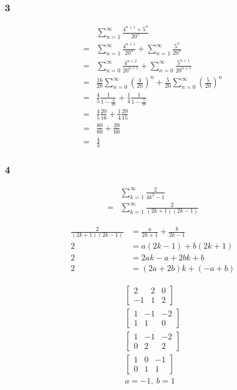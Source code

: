 \documentclass[12pt]{article}
\newcommand{\round}[1]{\left(       #1 \right)      }
\begin{document}
\subsubsection*{3}
\begin{align*}
     & \sum_{n=1}^\infty \frac{4^{n+1} + 5^n}{20^n} \\
    =& \sum_{n=1}^\infty \frac{4^{n+1}}{20^n} + \sum_{n=1}^\infty \frac{5^n}{20^n} \\
    =& \sum_{n=0}^\infty \frac{4^{n+2}}{20^{n+1}} + \sum_{n=0}^\infty \frac{5^{n+1}}{20^{n+1}} \\
    =& \frac{16}{20} \sum_{n=0}^\infty \round{\frac{4}{20}}^n + \frac{5}{20} \sum_{n=0}^\infty \round{\frac{5}{20}}^n \\
    =& \frac{4}{5} \frac{1}{1-\frac{4}{20}} + \frac{1}{4} \frac{1}{1-\frac{5}{20}} \\
    =& \frac{4}{5} \frac{20}{16} + \frac{1}{4} \frac{20}{15} \\
    =& \frac{80}{80} + \frac{20}{60} \\
    =& \frac{4}{3}
\end{align*}

\subsubsection*{4}
\begin{align*}
     & \sum_{k=1}^\infty \frac{2}{4k^2 - 1} \\
    =& \sum_{k=1}^\infty \frac{2}{(2k+1)(2k-1)}
\end{align*}

\begin{align*}
    \frac{2}{(2k+1)(2k-1)} &= \frac{a}{2k+1} + \frac{b}{2k-1} \\
    2 &= a(2k-1) + b(2k+1) \\
    2 &= 2ak - a + 2bk + b \\
    2 &= (2a+2b)k + (-a+b)
\end{align*}

\begin{align*}
    \begin{bmatrix}
        2 & 2 & 0 \\
        -1 & 1 & 2
    \end{bmatrix} \\
    \begin{bmatrix}
        1 & -1 & -2 \\
        1 & 1 & 0
    \end{bmatrix} \\
    \begin{bmatrix}
        1 & -1 & -2 \\
        0 & 2 & 2
    \end{bmatrix} \\
    \begin{bmatrix}
        1 & 0 & -1 \\
        0 & 1 & 1
    \end{bmatrix} \\
    a = -1,\ b = 1
\end{align*}
\end{document}
